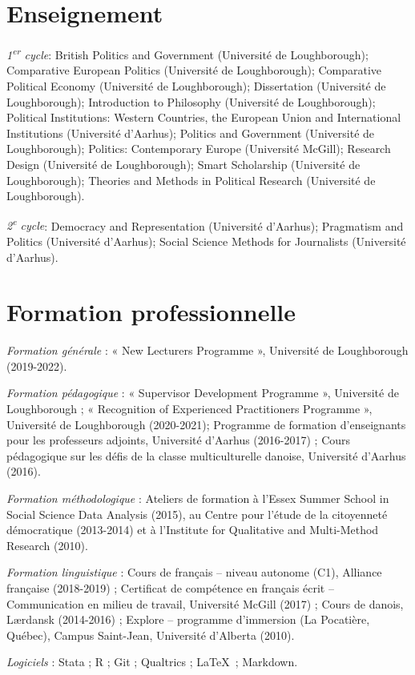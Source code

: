 \documentclass[letterpaper,fontsize=10.5pt]{scrartcl}
\begin{document}
\section{Enseignement}
{}\textit{1\textsuperscript{er} cycle}: British Politics and Government (Université de Loughborough); Comparative European Politics (Université de Loughborough); Comparative Political Economy (Université de Loughborough); Dissertation (Université de Loughborough); Introduction to Philosophy (Université de Loughborough); Political Institutions: Western Countries, the European Union and International Institutions (Université d'Aarhus); Politics and Government (Université de Loughborough); Politics: Contemporary Europe (Université McGill); Research Design (Université de Loughborough); Smart Scholarship (Université de Loughborough); Theories and Methods in Political Research (Université de Loughborough).\\
\hfill \break
{}
{}\textit{2\textsuperscript{e} cycle}: Democracy and Representation (Université d'Aarhus); Pragmatism and Politics (Université d'Aarhus); Social Science Methods for Journalists (Université d'Aarhus).

\section{Formation professionnelle}
{}\textit{Formation générale} : « New Lecturers Programme », Université de Loughborough (2019-2022).\\
\hfill \break
{}
{}\textit{Formation pédagogique} : « Supervisor Development Programme », Université de Loughborough ; « Recognition of Experienced Practitioners Programme », Université de Loughborough (2020-2021); Programme de formation d'enseignants pour les professeurs adjoints, Université d'Aarhus (2016-2017) ; Cours pédagogique sur les défis de la classe multiculturelle danoise, Université d'Aarhus (2016).\\
\hfill \break
{}
{}\textit{Formation méthodologique} : Ateliers de formation à l'Essex Summer School in Social Science Data Analysis (2015), au Centre pour l’étude de la citoyenneté démocratique (2013-2014) et	à l'Institute for Qualitative and Multi-Method Research (2010).\\
\hfill \break
{}
{}\textit{Formation linguistique} : Cours de français – niveau autonome (C1), Alliance française (2018-2019) ; Certificat de compétence en français écrit – Communication en milieu de travail, Université McGill (2017) ; Cours de danois, Lærdansk (2014-2016) ; Explore – programme d'immersion (La Pocatière, Québec), Campus Saint-Jean, Université d'Alberta (2010).\\
\hfill \break
{}
{}\textit{Logiciels} : Stata ; R ; Git ; Qualtrics ; \LaTeX\ ; Markdown.
\end{document}
